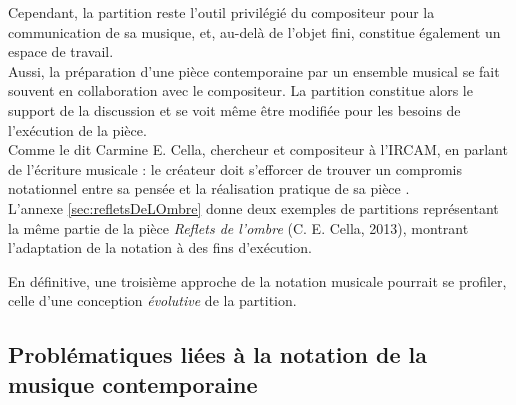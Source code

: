 Cependant, la partition reste l'outil privilégié du compositeur pour la communication de sa musique, et, au-delà de l'objet fini, constitue également un espace de travail.\\
Aussi, la préparation d'une pièce contemporaine par un ensemble musical se fait souvent en collaboration avec le compositeur. La partition constitue alors le support de la discussion et se voit même être modifiée pour les besoins de l'exécution de la pièce.\\
Comme le dit Carmine E. Cella, chercheur et compositeur à l'IRCAM, en parlant de l'écriture musicale : \og le créateur doit s'efforcer de trouver un compromis notationnel entre sa pensée et la réalisation pratique de sa pièce \fg.\\
L'annexe \ref{sec:refletsDeLOmbre} donne deux exemples de partitions représentant la même partie de la pièce \textit{Reflets de l'ombre} (C. E. Cella, 2013), montrant l'adaptation de la notation à des fins d'exécution.

En définitive, une troisième approche de la notation musicale pourrait se profiler, celle d'une conception \textit{évolutive} de la partition.

\subsection{Problématiques liées à la notation de la musique contemporaine}
\label{subsec:pbmatiquesMusiqueContemporaine}